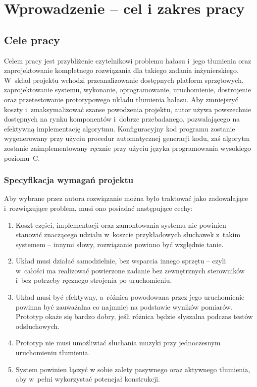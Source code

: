 \chapter{Wprowadzenie -- cel i zakres pracy}
\label{cha:intro}

\section{Cele pracy}
\label{sec:celePracy}
Celem pracy jest przybliżenie czytelnikowi problemu hałasu i~jego tłumienia oraz  zaprojektowanie kompletnego rozwiązania dla takiego zadania inżynierskiego. W~skład projektu wchodzi przeanalizowanie dostępnych platform sprzętowych, zaprojektowanie systemu, wykonanie, oprogramowanie, uruchomienie, dostrojenie oraz przetestowanie prototypowego układu tłumienia hałasu. Aby zmniejszyć koszty i~zmaksymalizować szanse powodzenia projektu, autor używa powszechnie dostępnych na rynku komponentów i~dobrze przebadanego, pozwalającego na efektywną implementację algorytmu. Konfiguracyjny kod programu zostanie wygenerowany przy użyciu procedur automatycznej generacji kodu, zaś algorytm zostanie zaimplementowany ręcznie przy użyciu języka programowania wysokiego poziomu~C.\\
\subsection{Specyfikacja wymagań projektu}
Aby wybrane przez autora rozwiązanie można było traktować jako zadowalające i~rozwiązujące problem, musi ono posiadać następujące cechy:
\begin{enumerate}
	\item Koszt części, implementacji oraz zamontowania systemu nie powinien stanowić znaczącego udziału w~koszcie przykładowych słuchawek z~takim systemem -- innymi słowy, rozwiązanie powinno być względnie tanie.
	\item Układ musi działać samodzielnie, bez wsparcia innego sprzętu -- czyli w~całości ma realizować powierzone zadanie bez zewnętrznych sterowników i~bez potrzeby ręcznego strojenia po uruchomieniu.
	\item Układ musi być efektywny, a~różnica powodowana przez jego uruchomienie powinna być zauważalna co najmniej na podstawie wyników pomiarów. Prototyp okaże się bardzo dobry, jeśli różnica będzie słyszalna podczas testów odsłuchowych.
	\item Prototyp nie musi umożliwiać słuchania muzyki przy jednoczesnym uruchomieniu tłumienia.
	\item System powinien łączyć w sobie zalety pasywnego oraz aktywnego tłumienia, aby w~pełni wykorzystać potencjał konstrukcji.
\end{enumerate}
